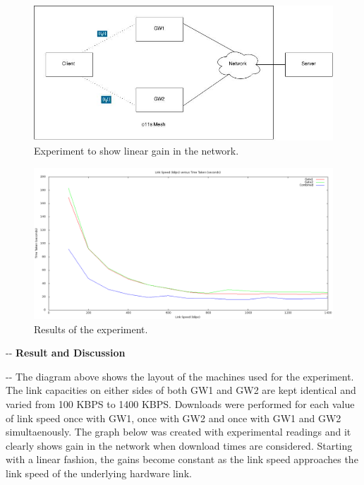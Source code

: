 \documentclass[12pt]{article}
\makeatletter
\newenvironment{indentation}[3]%
	{\par\setlength{\parindent}{#3}
	\setlength{\leftmargin}{#1}       \setlength{\rightmargin}{#1}%
	\advance\linewidth -\leftmargin       \advance\linewidth -\rightmargin%
	\advance\@totalleftmargin\leftmargin  \@setpar{{\@@par}}%
	\parshape 1\@totalleftmargin \linewidth\ignorespaces}{\par}%
\makeatother
\begin{document}
\begin{figure}[t]
  \centering
    \includegraphics[scale=0.50]{ExperimentLayout}
    \caption{Experiment to show linear gain in the network.}
    \label{Diagram: Experiment layout}
\end{figure}
\vspace*{5cm}
\begin{figure}[b]
    \centering
    \includegraphics[scale=0.35]{ExperimentGraph}
    \caption{Results of the experiment.}
    \label{Graph: Result}
\end{figure}
\pagebreak

\pagebreak
\begin{indentation}{0pt}{0pt}{0pt}
\textbf{{{\Large Result and Discussion}}}
\end{indentation}
\vspace{0.5cm}

\begin{indentation}{0pt}{0pt}{0pt}
  {\normalsize \hspace{1cm} The diagram above shows the layout of the machines used for the experiment. The link capacities on either sides of both GW1 and GW2 are kept identical and varied from 100 KBPS to 1400 KBPS. Downloads were performed for each value of link speed once with GW1, once with GW2 and once with GW1 and GW2 simultaenously. The graph below was created with experimental readings and it clearly shows  gain in the network when download times are considered. Starting with a linear fashion, the gains become constant as the link speed approaches the link speed of the underlying hardware link.}
\end{indentation}
\end{document}

